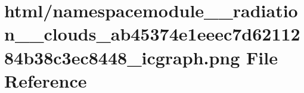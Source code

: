 \hypertarget{namespacemodule____radiation____clouds__ab45374e1eeec7d6211284b38c3ec8448__icgraph_8png}{}\section{html/namespacemodule\+\_\+\+\_\+radiation\+\_\+\+\_\+clouds\+\_\+ab45374e1eeec7d6211284b38c3ec8448\+\_\+icgraph.png File Reference}
\label{namespacemodule____radiation____clouds__ab45374e1eeec7d6211284b38c3ec8448__icgraph_8png}
